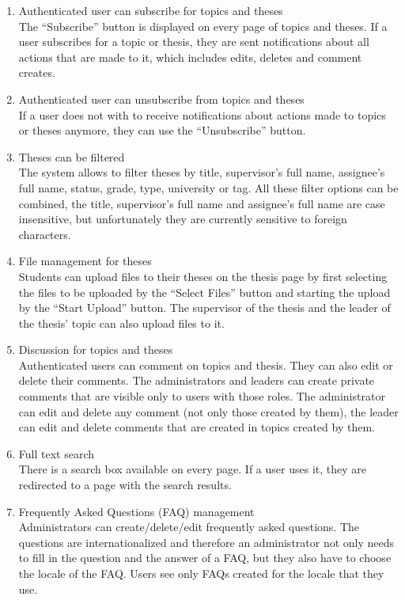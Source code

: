 \begin{enumerate}
    \item Authenticated user can subscribe for topics and theses\\
    The ``Subscribe'' button is displayed on every page of topics and theses. If a user subscribes for a topic or thesis, they are sent notifications about all actions that are made to it, which includes edits, deletes and comment creates.

    \item Authenticated user can unsubscribe from topics and theses\\
    If a user does not with to receive notifications about actions made to topics or theses anymore, they can use the ``Unsubscribe'' button.

    \item Theses can be filtered\\
    The system allows to filter theses by title, supervisor's full name, assignee's full name, status, grade, type, university or tag. All these filter options can be combined, the title, supervisor's full name and assignee's full name are case insensitive, but unfortunately they are currently sensitive to foreign characters.

    \item File management for theses\\
    Students can upload files to their theses on the thesis page by first selecting the files to be uploaded by the ``Select Files'' button and starting the upload by the ``Start Upload'' button. The supervisor of the thesis and the leader of the thesis' topic can also upload files to it.

    \item Discussion for topics and theses\\
    Authenticated users can comment on topics and thesis. They can also edit or delete their comments. The administrators and leaders can create private comments that are visible only to users with those roles. The administrator can edit and delete any comment (not only those created by them), the leader can edit and delete comments that are created in topics created by them.

    \item Full text search\\
    There is a search box available on every page. If a user uses it, they are redirected to a page with the search results. 

    \item Frequently Asked Questions (FAQ) management\\
    Administrators can create/delete/edit frequently asked questions. The questions are internationalized and therefore an administrator not only needs to fill in the question and the answer of a FAQ, but they also have to choose the locale of the FAQ. Users see only FAQs created for the locale that they use.

\end{enumerate}

